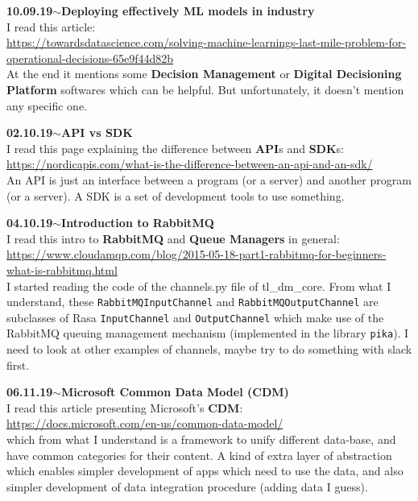 \documentclass[11pt,a4paper]{article}
\newenvironment{loggentry}[2]%
{\noindent\textbf{#1}\hspace{1cm}$\mathbf{\sim}$\text{ }\textbf{#2}\\}{\vspace{0.5cm}}
\begin{document}
\begin{loggentry}{10.09.19}{Deploying effectively ML models in industry}

I read this article:\\
\url{https://towardsdatascience.com/solving-machine-learnings-last-mile-problem-for-operational-decisions-65e9f44d82b}\\
At the end it mentions some \textbf{Decision Management} or \textbf{Digital Decisioning Platform} softwares which can be helpful. But unfortunately, it doesn't mention any specific one.

\end{loggentry}


\begin{loggentry}{02.10.19}{API vs SDK}

I read this page explaining the difference between \textbf{API}s and \textbf{SDK}s:\\
\url{https://nordicapis.com/what-is-the-difference-between-an-api-and-an-sdk/}\\
An API is just an interface between a program (or a server) and another program (or a server). A SDK is a set of development tools to use something.

\end{loggentry}


\begin{loggentry}{04.10.19}{Introduction to RabbitMQ}

I read this intro to \textbf{RabbitMQ} and \textbf{Queue Managers} in general:\\
\url{https://www.cloudamqp.com/blog/2015-05-18-part1-rabbitmq-for-beginners-what-is-rabbitmq.html}\\

I started reading the code of the channels.py file of tl\_dm\_core. From what I understand, these \texttt{RabbitMQInputChannel} and \texttt{RabbitMQOutputChannel} are subclasses of Rasa \texttt{InputChannel} and \texttt{OutputChannel} which make use of the RabbitMQ queuing management mechanism (implemented in the library \texttt{pika}). I need to look at other examples of channels, maybe try to do something with slack first.

\end{loggentry}


\begin{loggentry}{06.11.19}{Microsoft Common Data Model (CDM)}

I read this article presenting Microsoft's \textbf{CDM}:\\
\url{https://docs.microsoft.com/en-us/common-data-model/}\\
which from what I understand is a framework to unify different data-base, and have common categories for their content. A kind of extra layer of abstraction which enables simpler development of apps which need to use the data, and also simpler development of data integration procedure (adding data I guess).

\end{loggentry}
\end{document}
